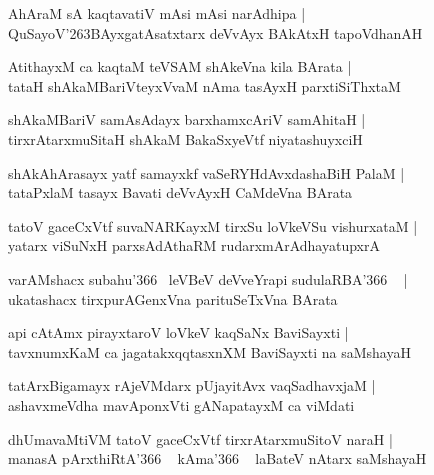 \documentclass[twoside,12pt,openright]{book}
\def\S{\char'263}
\newcounter{shloka}[chapter]
\begin{document}
\begin{shloka}
AhAraM sA kaqtavatiV mAsi mAsi narAdhipa |\\
QuSayoV\S BAyxgatAsatxtarx deVvAyx BAkAtxH tapoVdhanAH 
\end{shloka}

\begin{shloka}
AtithayxM ca kaqtaM teVSAM shAkeVna kila BArata |\\
tataH shAkaMBariVteyxVvaM nAma tasAyxH parxtiSiThxtaM 
\end{shloka}

\begin{shloka}
shAkaMBariV samAsAdayx barxhamxcAriV samAhitaH |\\
tirxrAtarxmuSitaH shAkaM BakaSxyeVtf niyatashuyxciH 
\end{shloka}

\begin{shloka}
shAkAhArasayx yatf samayxkf vaSeRYHdAvxdashaBiH PalaM |\\
tataPxlaM tasayx Bavati deVvAyxH CaMdeVna BArata
\end{shloka}

\begin{shloka}
tatoV gaceCxVtf suvaNARKayxM tirxSu loVkeVSu vishurxataM |\\
yatarx viSuNxH parxsAdAthaRM rudarxmArAdhayatupxrA 
\end{shloka}

\begin{shloka}
varAMshacx subahu\char'366 ~leVBeV deVveYrapi sudulaRBA\char'366 ~ |\\
ukatashacx tirxpurAGenxVna parituSeTxVna BArata
\end{shloka}

\begin{shloka}
api cAtAmx pirayxtaroV loVkeV kaqSaNx BaviSayxti |\\
tavxnumxKaM ca jagatakxqqtasxnXM BaviSayxti na saMshayaH 
\end{shloka}

\begin{shloka}
tatArxBigamayx rAjeVMdarx pUjayitAvx vaqSadhavxjaM |\\
ashavxmeVdha mavAponxVti gANapatayxM ca viMdati 
\end{shloka}

\begin{shloka}
dhUmavaMtiVM tatoV gaceCxVtf tirxrAtarxmuSitoV naraH |\\
manasA pArxthiRtA\char'366 ~ kAma\char'366 ~ laBateV nAtarx saMshayaH 
\end{shloka}
\end{document}
